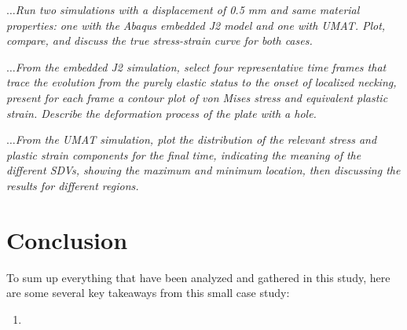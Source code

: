 \documentclass[12pt]{article}
\begin{document}
\textit{$\dots$Run two simulations with a displacement of 0.5 mm and same material properties: one with
the Abaqus embedded J2 model and one with UMAT. Plot, compare, and discuss the true stress-strain
curve for both cases.}
\vspace{1em}

\textit{$\dots$From the embedded J2 simulation, select four representative time frames that trace the
evolution from the purely elastic status to the onset of localized necking, present for each frame
a contour plot of von Mises stress and equivalent plastic strain. Describe the deformation
process of the plate with a hole.}
\vspace{1em}

\textit{$\dots$From the UMAT simulation, plot the distribution of the relevant stress and plastic strain
components for the final time, indicating the meaning of the different SDVs, showing the
maximum and minimum location, then discussing the results for different regions.}
\vspace{1em}

\section*{Conclusion}
To sum up everything that have been analyzed and gathered in this study, 
here are some several key takeaways from this small case study:
\begin{enumerate}
    \item 
\end{enumerate}
\end{document}
